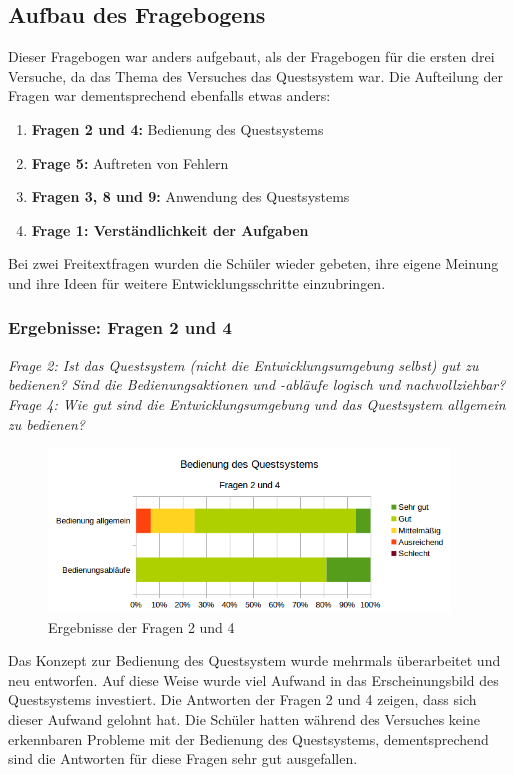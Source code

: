\subsection*{Aufbau des Fragebogens}
Dieser Fragebogen war anders aufgebaut, als der Fragebogen für die ersten drei Versuche, da das Thema des Versuches das Questsystem war. Die Aufteilung der Fragen war dementsprechend ebenfalls etwas anders:
\begin{enumerate}
\item \textbf{Fragen 2 und 4:} Bedienung des Questsystems
\item \textbf{Frage 5:} Auftreten von Fehlern
\item \textbf{Fragen 3, 8 und 9:} Anwendung des Questsystems
\item \textbf{Frage 1: Verständlichkeit der Aufgaben}
\end{enumerate}

Bei zwei Freitextfragen wurden die Schüler wieder gebeten, ihre eigene Meinung und ihre Ideen für weitere Entwicklungsschritte einzubringen.

\subsubsection*{Ergebnisse: Fragen 2 und 4}

\emph{Frage 2: Ist das Questsystem (nicht die Entwicklungsumgebung selbst) gut zu bedienen? Sind die Bedienungsaktionen und -abläufe logisch und nachvollziehbar? \\
Frage 4: Wie gut sind die Entwicklungsumgebung und das Questsystem allgemein zu bedienen?}

\begin{figure}[h!]
\centering
\includegraphics[width=0.95\textwidth]{./media/images/gui/trials/quest-f2-4.png}
\caption{Ergebnisse der Fragen 2 und 4}
\end{figure}

Das Konzept zur Bedienung des Questsystem wurde mehrmals überarbeitet und neu entworfen. Auf diese Weise wurde viel Aufwand in das Erscheinungsbild des Questsystems investiert. Die Antworten der Fragen 2 und 4 zeigen, dass sich dieser Aufwand gelohnt hat. Die Schüler hatten während des Versuches keine erkennbaren Probleme mit der Bedienung des Questsystems, dementsprechend sind die Antworten für diese Fragen sehr gut ausgefallen.

